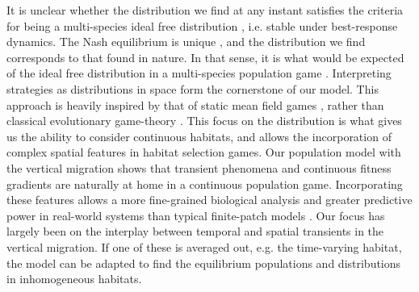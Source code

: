 It is unclear whether the distribution we find at any instant satisfies the criteria for being a multi-species ideal free distribution \citep{kvrivan2008ideal}, i.e. stable under best-response dynamics. The Nash equilibrium is unique \citep{verticalmigration}, and the distribution we find corresponds to that found in nature. In that sense, it is what would be expected of the ideal free distribution in a multi-species population game \citep{cressman2004ideal}.
Interpreting strategies as distributions in space form the cornerstone of our model. This approach is heavily inspired by that of static mean field games \citep{lasry2007mean, blanchet2016optimal}, rather than classical evolutionary game-theory \cite{hofbauer1998evolutionary}. This focus on the distribution is what gives us the ability to consider continuous habitats, and allows the incorporation of complex spatial features in habitat selection games. Our population model with the vertical migration shows that transient phenomena and continuous fitness gradients \citep{kawecki2004conceptual} are naturally at home in a continuous population game. Incorporating these features allows a more fine-grained biological analysis and greater predictive power in real-world systems than typical finite-patch models \citep{kvrivan2008ideal, sadowski2019predator}. Our focus has largely been on the interplay between temporal and spatial transients in the vertical migration. If one of these is averaged out, e.g. the time-varying habitat, the model can be adapted to find the equilibrium populations and distributions in inhomogeneous habitats.









